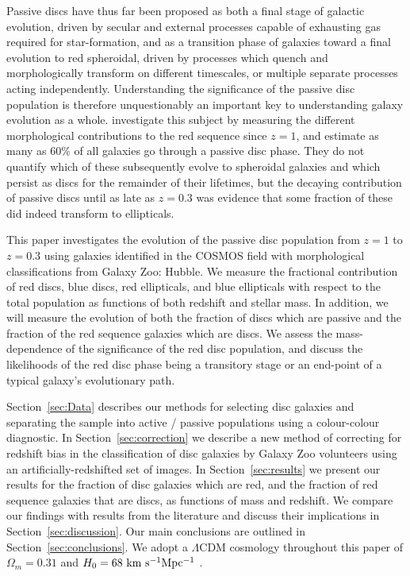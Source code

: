 \documentclass[useAMS,usenatbib]{mn2e}
\begin{document}
Passive discs have thus far been proposed as both a final stage of galactic evolution, driven by secular and external processes capable of exhausting gas required for star-formation, and as a transition phase of galaxies toward a final evolution to red spheroidal, driven by processes which quench and morphologically transform on different timescales, or multiple separate processes acting independently. Understanding the significance of the passive disc population is therefore unquestionably an important key to understanding galaxy evolution as a whole. \citet{Bundy2010} investigate this subject by measuring the different morphological contributions to the red sequence since $z=1$, and estimate as many as 60\% of all galaxies go through a passive disc phase. They do not quantify which of these subsequently evolve to spheroidal galaxies and which persist as discs for the remainder of their lifetimes, but the decaying contribution of passive discs until as late as $z=0.3$ was evidence that some fraction of these did indeed transform to ellipticals.

This paper investigates the evolution of the passive disc population from $z=1$ to $z=0.3$ using galaxies identified in the COSMOS field with morphological classifications from Galaxy Zoo: Hubble. We measure the fractional contribution of red discs, blue discs, red ellipticals, and blue ellipticals with respect to the total population as functions of both redshift and stellar mass. In addition, we will measure the evolution of both the fraction of discs which are passive and the fraction of the red sequence galaxies which are discs. We assess the mass-dependence of the significance of the red disc population, and discuss the likelihoods of the red disc phase being a transitory stage or an end-point of a typical galaxy's evolutionary path.

Section~\ref{sec:Data} describes our methods for selecting disc galaxies and separating the sample into active / passive populations using a colour-colour diagnostic. In Section~\ref{sec:correction} we describe a new method of correcting for redshift bias in the classification of disc galaxies by Galaxy Zoo volunteers using an artificially-redshifted set of images. In Section~\ref{sec:results} we present our results for the fraction of disc galaxies which are red, and the fraction of red sequence galaxies that are discs, as functions of mass and redshift. We compare our findings with results from the literature and discuss their implications in Section~\ref{sec:discussion}. Our main conclusions are outlined in Section~\ref{sec:conclusions}. We adopt a $\Lambda$CDM cosmology throughout this paper of $\Omega_m=0.31$ and $H_0=68~\rm km~s^{-1} Mpc^{-1}$ \citep{PlanckCollaboration2015}.
\end{document}

